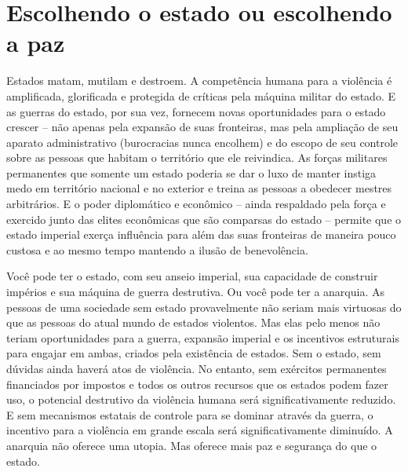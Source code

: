 \section{Escolhendo o estado ou escolhendo a paz}

Estados matam, mutilam e destroem. A competência humana para a violência é amplificada, glorificada e protegida de críticas pela máquina militar do estado. E as guerras do estado, por sua vez, fornecem novas oportunidades para o estado crescer -- não apenas pela expansão de suas fronteiras, mas pela ampliação de seu aparato administrativo (burocracias nunca encolhem) e do escopo de seu controle sobre as pessoas que habitam o território que ele reivindica. As forças militares permanentes que somente um estado poderia se dar o luxo de manter instiga medo em território nacional e no exterior e treina as pessoas a obedecer mestres arbitrários. E o poder diplomático e econômico -- ainda respaldado pela força e exercido junto das elites econômicas que são comparsas do estado -- permite que o estado imperial exerça influência para além das suas fronteiras de maneira pouco custosa e ao mesmo tempo mantendo a ilusão de benevolência.

Você pode ter o estado, com seu anseio imperial, sua capacidade de construir impérios e sua máquina de guerra destrutiva. Ou você pode ter a anarquia. As pessoas de uma sociedade sem estado provavelmente não seriam mais virtuosas do que as pessoas do atual mundo de estados violentos. Mas elas pelo menos não teriam oportunidades para a guerra, expansão imperial e os incentivos estruturais para engajar em ambas, criados pela existência de estados. Sem o estado, sem dúvidas ainda haverá atos de violência. No entanto, sem exércitos permanentes financiados por impostos e todos os outros recursos que os estados podem fazer uso, o potencial destrutivo da violência humana será significativamente reduzido. E sem mecanismos estatais de controle para se dominar através da guerra, o incentivo para a violência em grande escala será significativamente diminuído. A anarquia não oferece uma utopia. Mas oferece mais paz e segurança do que o estado.